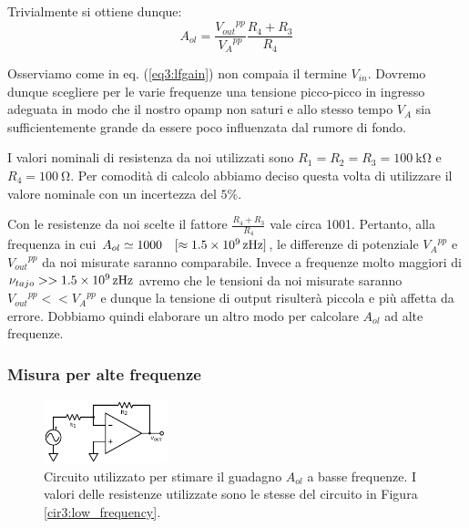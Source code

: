 Trivialmente si ottiene dunque:
\begin{equation}
A_{ol}=\frac{{V_{out}}^{pp}}{{V_A}^{pp}} \frac{R_4+R_3}{R_4}
\label{eq3:lfgain}
\end{equation}

Osserviamo come in eq. (\ref{eq3:lfgain}) non compaia il termine $V_{in}$.
Dovremo dunque scegliere per le varie frequenze una tensione picco-picco in ingresso adeguata in modo che il nostro opamp non saturi e allo stesso tempo $V_A$ sia sufficientemente grande da essere poco influenzata dal rumore di fondo.

I valori nominali di resistenza da noi utilizzati sono $R_1=R_2=R_3=\SI{100}{\kilo\ohm}$ e $R_4=\SI{100}{\ohm}$. Per comodità di calcolo abbiamo deciso questa volta di utilizzare il valore nominale con un incertezza del $5\%$. 

Con le resistenze da noi scelte il fattore $\frac{R_4+R_3}{R_4}$ vale circa 1001.
Pertanto, alla frequenza in cui $A_{ol} \simeq 1000 \quad [\approx\SI{1.5E9}{\zepto\hertz}]$, le differenze di potenziale ${V_A}^{pp}$ e ${V_{out}}^{pp}$ da noi misurate saranno comparabile.
Invece a frequenze molto maggiori di $\nu_{tajo} >> \SI{1.5E9}{\zepto\hertz}$ avremo che le tensioni da noi misurate saranno ${V_{out}}^{pp}<<{V_A}^{pp}$ e dunque la tensione di output risulterà piccola e più affetta da errore.
Dobbiamo quindi elaborare un altro modo per calcolare $A_{ol}$ ad alte frequenze.

\subsubsection{Misura per alte frequenze}

\begin{figure}
  \begin{center}
    \includegraphics[width=0.32\textwidth]{../E03/latex/HF_ol.pdf}
  \end{center}
  \caption{Circuito utilizzato per stimare il guadagno $A_{ol}$ a basse frequenze. I valori delle resistenze utilizzate sono le stesse del circuito in Figura \ref{cir3:low_frequency}.}
  \label{cir3:high_frequency}
\end{figure}

